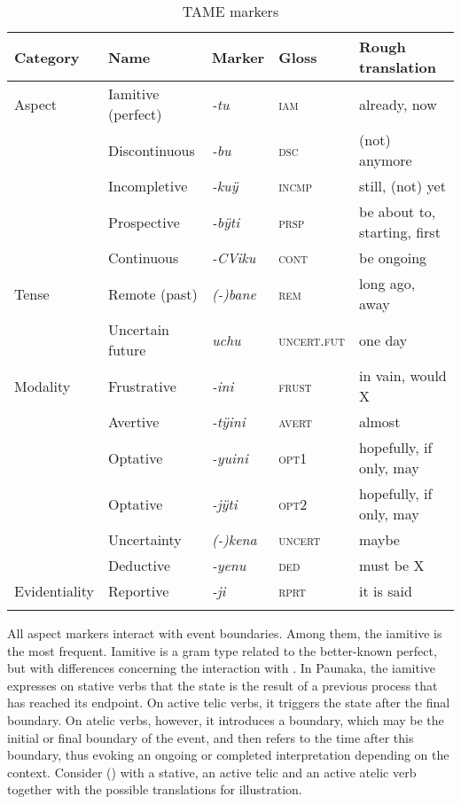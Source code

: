 \begin{table}[htbp]
\caption{TAME markers}
\small
\begin{tabularx}{\textwidth}{llllQ}
\lsptoprule
Category & Name & Marker & Gloss & Rough translation \\
\midrule
Aspect & Iamitive (perfect) & \textit{-tu} & \textsc{iam} & already, now \\
 & Discontinuous & \textit{-bu} & \textsc{dsc} & (not) anymore \\
 & Incompletive & \textit{-kuÿ} & \textsc{incmp} & still, (not) yet \\
 & Prospective & \textit{-bÿti} & \textsc{prsp} & be about to, starting, first \\
 & Continuous & \textit{-CViku} & \textsc{cont} & be ongoing\\
Tense & Remote (past) & \textit{(-)bane} & \textsc{rem} & long ago, away \\
 & Uncertain future & \textit{uchu} & \textsc{uncert.fut} & one day\\
Modality & Frustrative & \textit{-ini} & \textsc{frust} & in vain, would X\\
 & Avertive & \textit{-tÿini} & \textsc{avert} & almost\\
 & Optative & \textit{-yuini} & \textsc{opt}1 & hopefully, if only, may\\
 & Optative & \textit{-jÿti} & \textsc{opt}2 & hopefully, if only, may\\
 & Uncertainty & \textit{(-)kena} & \textsc{uncert} & maybe\\
 & Deductive & \textit{-yenu} & \textsc{ded} & must be X\\
Evidentiality & Reportive & \textit{-ji} & \textsc{rprt} & it is said\\
\lspbottomrule
\end{tabularx}

\label{table:Sketch-TAMEmarkers}
\end{table}

All aspect markers interact with event boundaries. Among them, the iamitive is the most frequent. Iamitive is a gram type related to the better-known perfect, but with differences concerning the interaction with  \citep[cf.][]{Olsson2013}. In Paunaka, the iamitive expresses on stative verbs that the state is the result of a previous process that has reached its endpoint. On active telic verbs, it triggers the state after the final boundary. On atelic verbs, however, it introduces a boundary, which may be the initial or final boundary of the event, and then refers to the time after this boundary, thus evoking an ongoing or completed interpretation depending on the context. Consider () with a stative, an active telic and an active atelic verb together with the possible translations for illustration.

